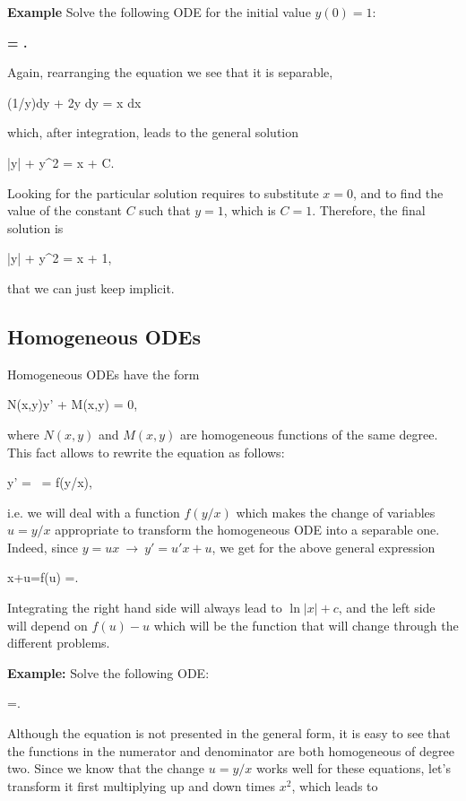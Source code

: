 {\bf Example} Solve the following ODE for the initial value $y(0)=1$:

{\bf \bnn {} = . \enn }

Again, rearranging the equation we see that it is separable,

\bnn (1/y)dy + 2y dy = \cos x dx \enn

which, after integration, leads to the general solution

\bnn \ln |y| + y^2 = \sin x + C. \enn

Looking for the particular solution requires to substitute $x=0$, and to find the value of the constant $C$ such that $y=1$, which is $C=1$. Therefore, the final solution is

\bnn \ln |y| + y^2 = \sin x + 1, \enn

that we can just keep implicit.

\subsection{Homogeneous ODEs}


Homogeneous ODEs have the form 

\bnn N(x,y)y' + M(x,y) = 0, \enn

where $N(x,y)$ and $M(x,y)$ are homogeneous functions of the same degree. This fact allows to rewrite the equation as follows:

 \bnn y' =\  = f(y/x), \enn

i.e. we will deal with a function $f(y/x)$ which makes the change of variables $u = y/x$ appropriate to transform the homogeneous ODE into a separable one. Indeed, since $y=ux \ \rightarrow \ y'=u'x+u$, we get for the above general expression

\bnn x+u=f(u) \quad \rightarrow {}=. \enn

Integrating the right hand side will always lead to $\ln |x|+c$, and the left side
will depend on $f(u)-u$ which will be the function that will change through the different problems.

{\bf Example: } Solve the following ODE:

\bnn
 	=.
\enn

Although the equation is not presented in the general form, it is easy to see that the functions in the numerator and denominator are both homogeneous of degree two. Since we know that the change $u = y/x$ works well for these equations, let's transform it first multiplying up and down times $x^2$, which leads to

